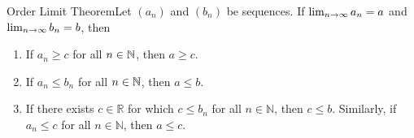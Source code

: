 \begin{ntheorem}
    {Order Limit Theorem}Let \((a_n)\) and \((b_n)\) be sequences. If \(\lim_{n \rightarrow \infty} a_n = a\) and \(\lim_{n \rightarrow \infty} b_n = b\), then
    \begin{enumerate}[label=(\roman*)]
        \item If \(a_n \geq c\) for all \(n \in \mathbb{N}\), then \(a \geq c\).
        \item If \(a_n \leq b_n\) for all \(n \in \mathbb{N}\), then \(a \leq b\).
        \item If there exists \( c \in \mathbb{R} \) for which \( c \leq b_n \) for all \( n \in \mathbb{N} \), then \( c \leq b \). Similarly, if \( a_n \leq c \) for all \( n \in \mathbb{N} \), then \( a \leq c \).

    \end{enumerate}
\end{ntheorem}








